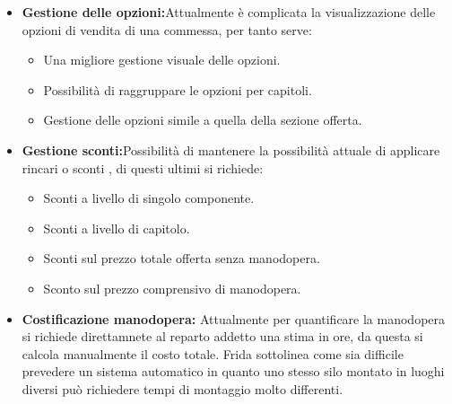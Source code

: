 \documentclass[12pt, a4paper]{article} %
\begin{document}
\begin{itemize}
      \item \textbf{Gestione delle opzioni:}Attualmente è complicata la visualizzazione delle opzioni di vendita di una commessa, per tanto serve:
            \begin{itemize}
                  \item Una migliore gestione visuale delle opzioni.
                  \item Possibilità di raggruppare le opzioni per capitoli.
                  \item Gestione delle opzioni simile a quella della sezione offerta.
            \end{itemize}
      \item \textbf{Gestione sconti:}Possibilità di mantenere la possibilità attuale di applicare rincari o sconti , di questi ultimi si richiede:
            \begin{itemize}
                  \item Sconti a livello di singolo componente.
                  \item Sconti a livello di capitolo.
                  \item Sconti sul prezzo totale offerta senza manodopera.
                  \item Sconto sul prezzo comprensivo di manodopera.
            \end{itemize}
      \item \textbf{Costificazione manodopera:} Attualmente per quantificare la manodopera si richiede direttamnete al reparto addetto una stima in ore,
            da questa si calcola manualmente il costo totale. Frida sottolinea come sia difficile prevedere un sistema automatico in quanto uno stesso silo
            montato in luoghi diversi può richiedere tempi di montaggio molto differenti.
\end{itemize}
\end{document}
